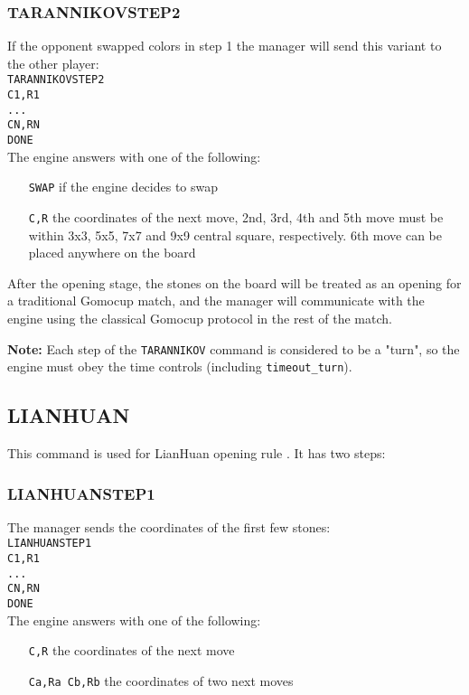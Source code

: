 \documentclass[12pt,a4paper]{article}
\begin{document}
\subsubsection{TARANNIKOVSTEP2}
If the opponent swapped colors in step 1 the manager will send this variant to the other player:\\
\texttt{TARANNIKOVSTEP2}\\
\texttt{C1,R1}\\
\texttt{...}\\
\texttt{CN,RN}\\
\texttt{DONE}\\
The engine answers with one of the following:
\begin{enumerate}[leftmargin=7.5em]
\item[\texttt{SWAP}]{if the engine decides to swap}
\item[\texttt{C,R}]{the coordinates of the next move, 2nd, 3rd, 4th and 5th move must be within 3x3, 5x5, 7x7 and 9x9 central square, respectively. 6th move can be placed anywhere on the board}
\end{enumerate}

After the opening stage, the stones on the board will be treated as an opening for a traditional Gomocup match, and the manager will communicate with the engine using the classical Gomocup protocol in the rest of the match.

\textbf{Note:} Each step of the \texttt{TARANNIKOV} command is considered to be a "turn", so the engine must obey the time controls (including \texttt{timeout{\_}turn}).


\subsection{LIANHUAN}
\label{cmd_lianhuan}
This command is used for LianHuan opening rule \cite{renju_opening_rules}. It has two steps:

\subsubsection{LIANHUANSTEP1}
The manager sends the coordinates of the first few stones:\\
\texttt{LIANHUANSTEP1}\\
\texttt{C1,R1}\\
\texttt{...}\\
\texttt{CN,RN}\\
\texttt{DONE}\\
The engine answers with one of the following:
\begin{enumerate}[leftmargin=7.5em]
\item[\texttt{C,R}]{the coordinates of the next move}
\item[\texttt{Ca,Ra Cb,Rb}]{the coordinates of two next moves}
\end{enumerate}
\end{document}
